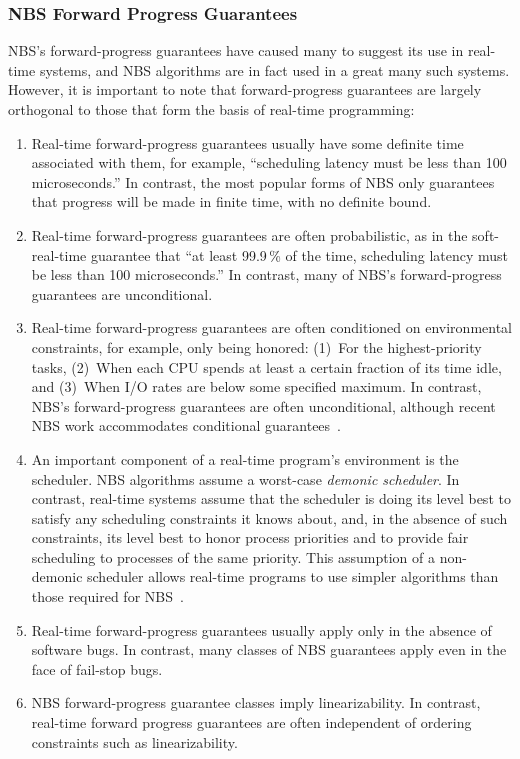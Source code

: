 \fi

\subsubsection{NBS Forward Progress Guarantees}
\label{sec:advsync:NBS Forward Progress Guarantees}

NBS's forward-progress guarantees have caused many to suggest its use in
real-time systems, and NBS algorithms are in fact used in a great many
such systems.
However, it is important to note that forward-progress guarantees are
largely orthogonal to those that form the basis of real-time programming:

\begin{enumerate}
\item	Real-time forward-progress guarantees usually have some
	definite time associated with them, for example,
	``scheduling latency must be less than 100 microseconds.''
	In contrast, the most popular forms of NBS only guarantees
	that progress will be made in finite time, with no definite
	bound.
\item	Real-time forward-progress guarantees are often
	probabilistic, as in the soft-real-time guarantee that
	``at least 99.9\,\% of the time, scheduling latency must
	be less than 100 microseconds.''
	In contrast, many of NBS's forward-progress guarantees are
	unconditional.
\item	Real-time forward-progress guarantees are often conditioned on
	environmental constraints, for example, only being honored:
	(1)~For the highest-priority tasks,
	(2)~When each CPU spends at least a certain fraction of its time idle,
	and (3)~When I/O rates are below some specified maximum.
	In contrast, NBS's forward-progress
	guarantees are often unconditional, although recent NBS work
	accommodates conditional
	guarantees~\cite{DanAlitarh2013PracticalProgress}.
\item	An important component of a real-time program's environment
	is the scheduler.
	NBS algorithms assume a worst-case \emph{demonic scheduler}.
	In contrast, real-time systems assume that the scheduler is
	doing its level best to satisfy any scheduling constraints
	it knows about, and, in the absence of such constraints,
	its level best to honor process priorities and to provide
	fair scheduling to processes of the same priority.
	This assumption of a non-demonic scheduler allows real-time
	programs to use simpler algorithms than those required for
	NBS~\cite{DanAlitarh2013PracticalProgress,BjoernBrandenburgPhD}.
\item	Real-time forward-progress guarantees usually apply only
	in the absence of software bugs.
	In contrast, many classes of NBS guarantees apply even in the
	face of fail-stop bugs.
\item	NBS forward-progress guarantee classes imply linearizability.
	In contrast, real-time forward progress guarantees are often
	independent of ordering constraints such as linearizability.
\end{enumerate}

